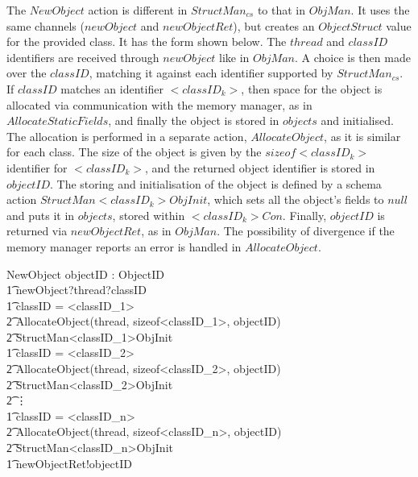 The $NewObject$ action is different in $StructMan_{cs}$ to that in
$ObjMan$.
It uses the same channels ($newObject$ and $newObjectRet$), but
creates an $ObjectStruct$ value for the provided class.
It has the form shown below.
The $thread$ and $classID$ identifiers are received through
$newObject$ like in $ObjMan$.
A choice is then made over the $classID$, matching it against each
identifier supported by $StructMan_{cs}$.
If $classID$ matches an identifier ${<}classID_k{>}$, then space for
the object is allocated via communication with the memory manager, as
in $AllocateStaticFields$, and finally the object is stored in
$objects$ and initialised.
The allocation is performed in a separate action, $AllocateObject$, as
it is similar for each class.
The size of the object is given by the $sizeof{<}classID_k{>}$
identifier for ${<}classID_k{>}$, and the returned object identifier
is stored in $objectID$.
The storing and initialisation of the object is defined by a schema
action $StructMan{<}classID_k{>}ObjInit$, which sets all the object's
fields to $null$ and puts it in $objects$, stored within
${<}classID_k{>}Con$. 
Finally, $objectID$ is returned via $newObjectRet$, as in $ObjMan$.
The possibility of divergence if the memory manager reports an error
is handled in $AllocateObject$.
\begin{circusaction}
  NewObject \circdef \circvar objectID : ObjectID \circspot \\
  \t1 newObject?thread?classID \then \\
  \t1 \circif classID = {{<}classID_1{>}} \circthen {} \\
  \t2 AllocateObject(thread, sizeof{<}classID_1{>}, objectID) \circseq \\
  \t2 \lschexpract StructMan{<}classID_1{>}ObjInit \rschexpract \\
  \t1 {} \circelse classID = {{<}classID_2{>}} \circthen {} \\
  \t2 AllocateObject(thread, sizeof{<}classID_2{>}, objectID) \circseq \\
  \t2 \lschexpract StructMan{<}classID_2{>}ObjInit \rschexpract \\
  \t2 \vdots \\
  \t1 {} \circelse classID = {{<}classID_n{>}} \circthen {} \\
  \t2 AllocateObject(thread, sizeof{<}classID_n{>}, objectID) \circseq \\
  \t2 \lschexpract StructMan{<}classID_n{>}ObjInit \rschexpract \\
  \t1 \circfi \circseq newObjectRet!objectID \then \Skip \\
\end{circusaction}


